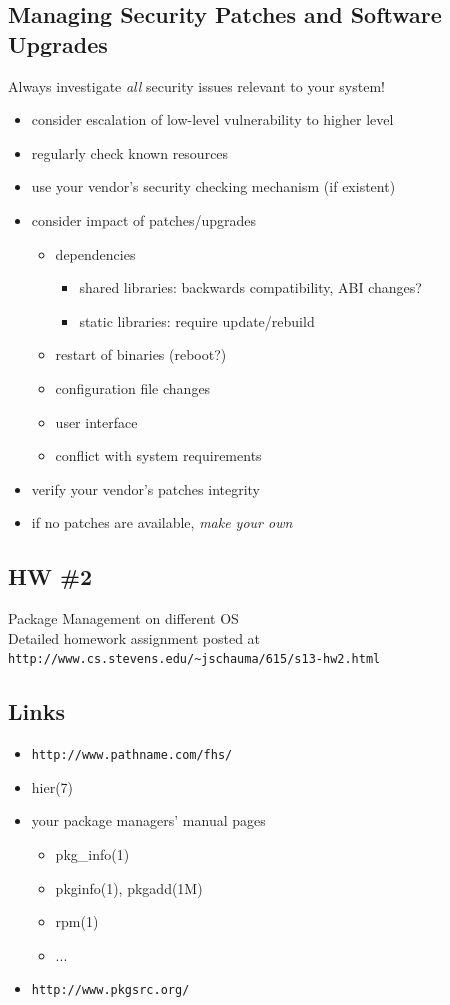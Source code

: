 \documentclass[xga]{xdvislides}
\begin{document}
\subsection{Managing Security Patches and Software Upgrades}
Always investigate {\em all} security issues relevant to your system!
\begin{itemize}
	\item consider escalation of low-level vulnerability to higher level
	\item regularly check known resources
	\item use your vendor's security checking mechanism (if existent)
	\item consider impact of patches/upgrades
		\begin{itemize}
			\item dependencies
				\begin{itemize}
					\item shared libraries:  backwards compatibility, ABI
						changes?
					\item static libraries:  require update/rebuild
				\end{itemize}
			\item restart of binaries (reboot?)
			\item configuration file changes
			\item user interface
			\item conflict with system requirements
		\end{itemize}
	\item verify your vendor's patches integrity
	\item if no patches are available, {\em make your own}
\end{itemize}

\subsection{HW \#2}
Package Management on different OS
\\

Detailed homework assignment posted at
\verb+http://www.cs.stevens.edu/~jschauma/615/s13-hw2.html+


\subsection{Links}
\begin{itemize}
	\item \verb+http://www.pathname.com/fhs/+
	\item hier(7)
	\item your package managers' manual pages
		\begin{itemize}
			\item pkg\_info(1)
			\item pkginfo(1), pkgadd(1M)
			\item rpm(1)
			\item ...
		\end{itemize}
	\item \verb+http://www.pkgsrc.org/+
\end{itemize}
\end{document}
